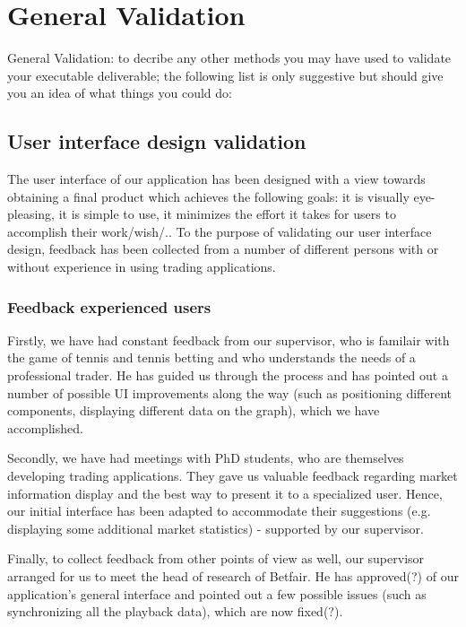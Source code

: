 \documentclass[10pt]{article}
\begin{document}
\section{General Validation}
General Validation: to decribe any other methods you may have used to validate your executable deliverable; the following list is only suggestive but should give you an idea of what things you could do:

\subsection{User interface design validation}

The user interface of our application has been designed with a view towards obtaining a final product which achieves the following goals: it is visually eye-pleasing, it is simple to use, it minimizes the effort it takes for users to accomplish their work/wish/..
To the purpose of validating our user interface design, feedback has been collected from a number of different persons with or without experience in using trading applications.

\subsubsection{Feedback experienced users}

Firstly, we have had constant feedback from our supervisor, who is familair with the game of tennis and tennis betting and who understands the needs of a professional trader. He has guided us through the process and has pointed out a number of possible UI improvements along the way (such as positioning different components, displaying different data on the graph), which we have accomplished.

Secondly, we have had meetings with PhD students, who are themselves developing trading applications. They gave us valuable feedback regarding market information display and the best way to present it to a specialized user. Hence, our initial interface has been adapted to accommodate their suggestions (e.g. displaying some additional market statistics) - supported by our supervisor.

Finally, to collect feedback from other points of view as well, our supervisor arranged for us to meet the head of research of Betfair. He has approved(?) of our application's general interface and pointed out a few possible issues (such as synchronizing all the playback data), which are now fixed(?).
\end{document}
